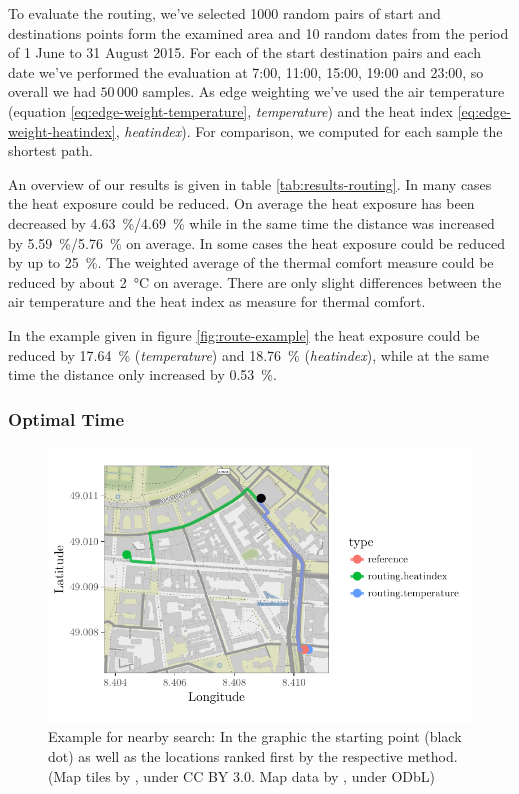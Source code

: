 To evaluate the routing, we've selected 1000 random pairs of start and destinations points form the examined  area and 10 random dates from the period of 1 June to 31 August 2015. For each of the start destination pairs and each date we've performed the evaluation at 7:00, 11:00, 15:00, 19:00 and 23:00, so overall we had $50\,000$ samples. As edge weighting we've used the air temperature (equation \eqref{eq:edge-weight-temperature}, \emph{temperature})  and the heat index \eqref{eq:edge-weight-heatindex}, \emph{heatindex}). For comparison, we computed for each sample the shortest path. 

An overview of our results is given in table \ref{tab:results-routing}. In many cases the heat exposure could be reduced. On average the heat exposure has been decreased by \SI{4.63}{\percent}/\SI{4.69}{\percent} while in the same time the distance was increased by  \SI{5.59}{\percent}/\SI{5.76}{\percent} on average. In some cases the heat exposure could be reduced by up to \SI{25}{\percent}. The weighted average of the thermal comfort measure could be reduced by about \SI{2}{\celsius} on average. There are only slight differences between the air temperature and the heat index as measure for thermal comfort. 

In the example given in figure \ref{fig:route-example} the heat exposure could be reduced by \SI{17.64}{\percent} (\emph{temperature}) and \SI{18.76}{\percent} (\emph{heatindex}), while at the same time the distance only increased by  \SI{0.53}{\percent}.

\subsubsection{Optimal Time}

\begin{figure}
	\centering
	\includegraphics[scale=0.9]{figures/optimaltime_route_example}
	\caption{Example for nearby search: In the graphic the starting point (black dot) as well as the locations ranked first by the respective method. (Map tiles by \textcite{Stamen2017}, under CC BY 3.0. Map data by \textcite{OSMF2016}, under ODbL)}
	\label{fig:optimaltime-route-example}
\end{figure}

